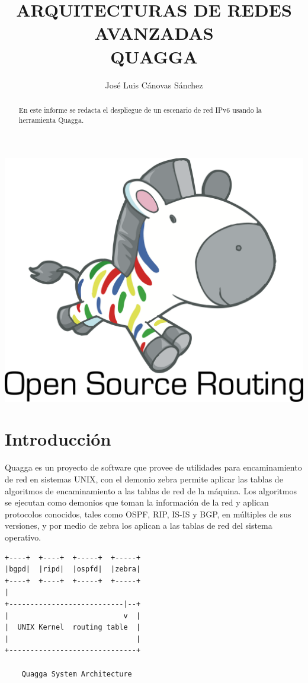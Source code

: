 \documentclass{article}
\author{José Luis Cánovas Sánchez}
\title{ARQUITECTURAS DE REDES AVANZADAS\\QUAGGA}
\begin{document}
\maketitle

\begin{center}
	\includegraphics[scale=0.3]{images/mascota.png}
\end{center}

\begin{abstract}
	En este informe se redacta el despliegue de un escenario de red IPv6 usando la herramienta Quagga.
\end{abstract}

\tableofcontents

\section{Introducción}

Quagga es un proyecto de software que provee de utilidades para encaminamiento de red en sistemas UNIX, con el demonio zebra permite aplicar las tablas de algoritmos de encaminamiento a las tablas de red de la máquina. Los algoritmos se ejecutan como demonios que toman la información de la red y aplican protocolos conocidos, tales como OSPF, RIP, IS-IS y BGP, en múltiples de sus versiones, y por medio de zebra los aplican a las tablas de red del sistema operativo.

\begin{center}
	\begin{BVerbatim}
+----+  +----+  +-----+  +-----+
|bgpd|  |ripd|  |ospfd|  |zebra|
+----+  +----+  +-----+  +-----+
|
+---------------------------|--+
|                           v  |
|  UNIX Kernel  routing table  |
|                              |
+------------------------------+

    Quagga System Architecture
	\end{BVerbatim}
\end{center}
\end{document}
